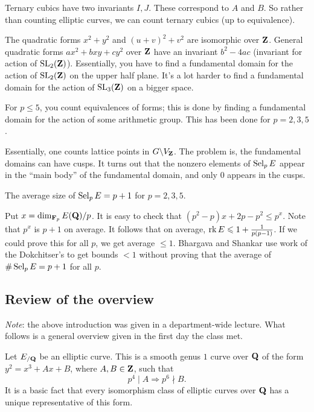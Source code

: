 Ternary cubics have two invariants $I,J$. These correspond to $A$ and $B$. So 
rather than counting elliptic curves, we can count ternary cubics (up to 
equivalence). 

The quadratic forms $x^2+y^2$ and $(u+v)^2+v^2$ are isomorphic over $\mathbf{Z}$. 
General quadratic forms $a x^2+b x y+c y^2$ over $\mathbf{Z}$ have an invariant 
$b^2-4 a c$ (invariant for action of $\operatorname{SL}_2(\mathbf{Z})$). Essentially, you have 
to find a fundamental domain for the action of $\operatorname{SL}_2(\mathbf{Z})$ on the upper 
half plane. It's a lot harder to find a fundamental domain for the action 
of $\operatorname{SL}_3(\mathbf{Z})$ on a bigger space. 

For $p\leqslant 5$, you count equivalences of forms; this is done by 
finding a fundamental domain for the action of some arithmetic group. 
This has been done for $p=2,3,5$. 

Essentially, one counts lattice points in $G\backslash V_{\mathbf{Z}}$. The problem 
is, the fundamental domains can have cusps. It turns out that the 
nonzero elements of $\operatorname{Sel}_p E$ appear in the ``main body'' of the 
fundamental domain, and only $0$ appears in the cusps. 

\begin{theorem}
The average size of $\operatorname{Sel}_p E=p+1$ for $p=2,3,5$. 
\end{theorem}

Put $x=\dim_{\mathbf{F}_p} E(\mathbf{Q})/p$. It is easy to check that 
$(p^2-p) x+2 p-p^2 \leqslant p^x$. Note that $p^x$ is $p+1$ on average. 
It follows that on average, $\operatorname{rk} E\leqslant 1+\frac{1}{p(p-1)}$. 
If we could prove this for all $p$, we get average $\leqslant 1$. Bhargava 
and Shankar use work of the Dokchitser's to get bounds $<1$ without proving 
that the average of $\#\operatorname{Sel}_p E=p+1$ for all $p$. 





\subsection{Review of the overview}

\emph{Note}: the above introduction was given in a department-wide lecture. 
What follows is a general overview given in the first day the class met. 

Let $E_{/\mathbf{Q}}$ be an elliptic curve. This is a smooth genus $1$ curve over 
$\mathbf{Q}$ of the form $y^2=x^3+A x+B$, where $A,B\in \mathbf{Z}$, such that 
\[
  p^4\mid A\Rightarrow p^6\nmid B .
\]
It is a basic fact that every isomorphism class of elliptic curves over 
$\mathbf{Q}$ has a unique representative of this form. 

